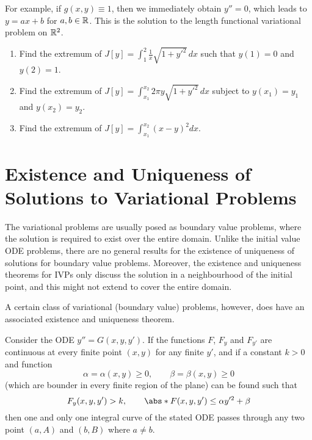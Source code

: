 \documentclass[11pt]{penrose}
\begin{document}
For example, if $g(x, y) \equiv 1$, then we immediately obtain $y'' = 0$, which leads to $y = ax + b$ for $a, b \in \mathbb{R}$. This is the solution to the length functional variational problem on $\mathbb{R}^2$.

\begin{nex}
\phantom{.}
    \begin{enumerate}[label=(\roman*)]
        \item Find the extremum of $J[y] = \int_{1}^{2} \frac{1}{x} \sqrt{1 + y'^2} \,dx$ such that $y(1) = 0$ and $y(2) = 1$.
        \item Find the extremum of $J[y] = \int_{x_1}^{x_2} 2\pi y \sqrt{1 + y'^2} \,dx$ subject to $y(x_1) = y_1$ and $y(x_2) = y_2$.
        \item Find the extremum of $J[y] = \int_{x_1}^{x_2} (x-y)^2 dx$.
    \end{enumerate}
\end{nex}

\section{Existence and Uniqueness of Solutions to Variational Problems}
The variational problems are usually posed as boundary value problems, where the solution is required to exist over the entire domain. Unlike the initial value ODE problems, there are no general results for the existence of uniqueness of solutions for boundary value problems. Moreover, the existence and uniqueness theorems for IVPs only discuss the solution in a neighbourhood of the initial point, and this might not extend to cover the entire domain.

A certain class of variational (boundary value) problems, however, does have an associated existence and uniqueness theorem.
\begin{nthm}[Bernstein]
    Consider the ODE $y'' = G(x, y, y')$. If the functions $F$, $F_y$ and $F_{y'}$ are continuous at every finite point $(x,y)$ for any finite $y'$, and if a constant $k > 0$ and function
    \begin{equation*}
        \alpha = \alpha(x,y) \geq 0,
        \qquad
        \beta = \beta(x,y) \geq 0
    \end{equation*}
    (which are bounder in every finite region of the plane) can be found such that
    \begin{equation*}
        F_y (x,y,y') > k,
        \qquad
        \abs*{F(x,y,y')} \leq \alpha y'^2 + \beta
    \end{equation*}
    then one and only one integral curve of the stated ODE passes through any two point $(a, A)$ and $(b, B)$ where $a \neq b$.
\end{nthm}
\end{document}
